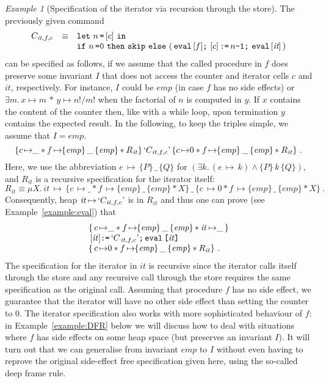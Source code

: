 \documentclass{LMCS}
\theoremstyle{remark}
\newtheorem{example}[theorem]{Example}
\newcommand{\QUOTE}[1]{\textnormal{`\ensuremath{#1}'}}
\newcommand{\UNQUOTE}[1]{\SYN{eval}\,{#1}}
\newcommand{\SYN}[1]{\ensuremath{\texttt{#1}}}
\newcommand{\triple}[3]{{\ensuremath{\!\left.\{ #1 \}\, #2\, \{  #3 \}\!\right.}}}
\newcommand{\pointsto}{\ensuremath{\mapsto}}
\newcommand{\EMP}{\ensuremath{\textit{emp}}}
\begin{document}
\begin{example}[Specification of the iterator via recursion through the store]\label{example:spec}
The previously given command
\[\begin{array}{lcl}
C_{\mathit{it},f,c} & \equiv & \SYN{let}\ n\, \SYN{=}\, [c]\ \SYN{in} \\
&& \SYN{if}\ n\,\SYN{=0}\ \SYN{then}\ \SYN{skip}\  \SYN{else}\  (\,  \UNQUOTE{[f]} \SYN{;}\ [c]\, \SYN{:=}\, n \SYN{-1} \SYN{;}\ \UNQUOTE{[\emph{it}]} \, ) 
\end{array}\]
can be specified as follows, if we assume that the called procedure in $f$ does preserve some invariant $I$ that does not access the counter and iterator cells $c$ and $\mathit{it}$, respectively. For instance, $I$ could be $\EMP$ (in case $f$ has no side effects) or \ $\exists m.\, x\mapsto m \, *\, y\mapsto n!/m!$ when the factorial  of $n$ is computed in $y$. If $x$ contains the content of the counter then, like with a while loop, upon termination $y$ contains the expected result. In the following, to keep the triples simple, we assume that $I=\EMP$. 
$$
\triple{c\, {\pointsto}\_ * f\,{\pointsto}\triple{\EMP}{\_}{\EMP} * R_{\mathit{it}}}
{\QUOTE{C_{\mathit{it},f,c}}}
{c\,{\pointsto}0  * f\,{\pointsto}\triple{\EMP}{\_}{\EMP} * R_{\mathit{it}}}\ .$$
Here, we use the abbreviation 
$e\,{\pointsto}\,\triple{P}{\_}{Q}$ for 
$(\exists k.\, (e\,{\pointsto}\, k) \wedge \triple{P}{k}{Q})$, and
 $R_{\mathit{it}}$ is a recursive specification for the iterator itself:
$$R_{\mathit{it}} \equiv \mu X.\, \mathit{it} \, {\pointsto}\,
 \triple{c\,{\pointsto}\_ * f\,{\pointsto}\triple{\EMP}{\_}{\EMP} * X}
 {\_}
{c\,{\pointsto}0 * f\,{\pointsto}\triple{\EMP}{\_}{\EMP} * X}\ .
$$
Consequently, heap $\mathit{it}\,{\pointsto}\, \QUOTE{C_{\mathit{it},f,c}}$ is in $R_{\mathit{it}}$ and thus one can prove (see Example~\ref{example:eval}) that
\[\begin{array}{l}
\{\, c\,{\pointsto}\_ * f\,{\pointsto}\triple{\EMP}{\_}{\EMP} * \mathit{it}\,{\pointsto}\_ \, \}
\\
\, [\mathit{it}]  \SYN{:=}\,  \QUOTE{C_{\, \mathit{it},f,c}}  \SYN{;}\, \SYN{\UNQUOTE{[$\mathit{it}$]}}\\
\{\, c\, {\pointsto}0 * f\,{\pointsto} \triple{\EMP}{\_}{\EMP} * R_{\mathit{it}} \}\ .
\end{array}
\]
The   specification for the iterator in $\mathit{it}$ is recursive since the iterator calls itself through the store and any recursive call through the store
requires the same specification as the original call.
Assuming that  procedure $f$ has no side effect,
we guarantee that the iterator will  have no other side effect than setting the counter to $0$. 
The iterator specification   also works with more sophisticated behaviour of $f$: in Example~\ref{example:DFR}   below we will   discuss  how to deal with situations where  $f$ has side effects on some heap space (but preserves an invariant $I$). It will turn out that we can generalise from invariant $\EMP$ to $I$ without even having to reprove the original  side-effect free specification given here, using the so-called deep frame rule.
\end{example}
\end{document}
